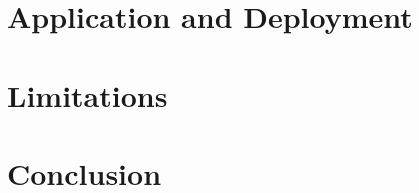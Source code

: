 \documentclass[conference]{IEEEtran}
\begin{document}
\section{Application and Deployment}


\section{Limitations}


\section{Conclusion}

\end{document}
